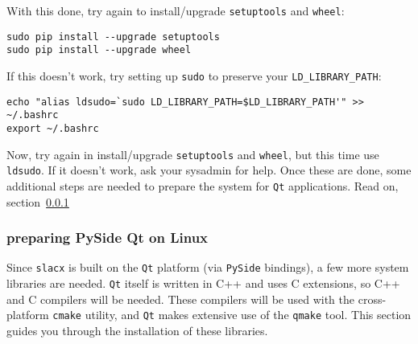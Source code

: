 With this done, try again to install/upgrade \verb|setuptools| and \verb|wheel|:
\begin{lstlisting}
sudo pip install --upgrade setuptools 
sudo pip install --upgrade wheel 
\end{lstlisting}
If this doesn't work, try setting up \verb|sudo| to preserve your \verb|LD_LIBRARY_PATH|:
\begin{lstlisting}
echo "alias ldsudo=`sudo LD_LIBRARY_PATH=$LD_LIBRARY_PATH'" >> ~/.bashrc
export ~/.bashrc
\end{lstlisting}

Now, try again in install/upgrade \verb|setuptools| and \verb|wheel|,
but this time use \verb|ldsudo|.
If it doesn't work, ask your sysadmin for help.
Once these are done, some additional steps are needed
to prepare the system for \verb|Qt| applications.
Read on, section~\ref{subsubsec:pyside_linux}


\subsubsection{preparing PySide Qt on Linux}
\label{subsubsec:pyside_linux}

Since \verb|slacx| is built on the \verb|Qt| platform 
(via \verb|PySide| bindings),
a few more system libraries are needed.
\verb|Qt| itself is written in C++
and uses C extensions,
so C++ and C compilers will be needed.
These compilers will be used with the 
cross-platform \verb|cmake| utility,
and \verb|Qt| makes extensive use of the \verb|qmake| tool.
This section guides you through the installation of these libraries.


